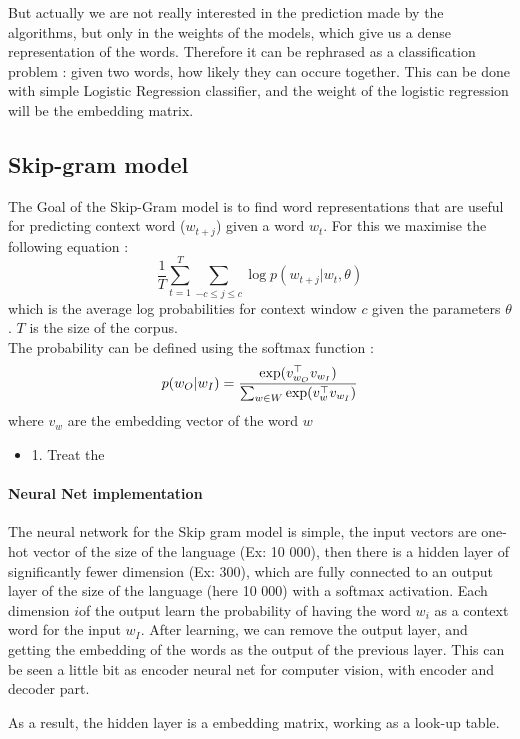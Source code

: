 			But actually we are not really interested in the prediction made by the algorithms, but only in the weights of the models, which give us a dense representation of the words. Therefore it can be rephrased as a classification problem : given two words, how likely they can occure together. This can be done with simple Logistic Regression classifier, and the weight of the logistic regression will be  the embedding matrix. 
  
		\subsection*{Skip-gram model}

			The Goal of the Skip-Gram model is to find word representations that are useful for predicting context word ($w_{t+j}$) given a word $w_t$. For this we maximise the following equation : 
			\[
				\frac{1}{T}\sum^T_{t=1} \sum_{-c\leq j\leq c}\log p(w_{t+j} | w_t, \theta)
			\]
			which is the average log probabilities for context window $c$ given the parameters $\theta$. $T$ is the size of the corpus.\\
			The probability can be defined using the softmax function : 
			\[
				p(w_O |  w_I) = \frac{\exp(v_{w_O}^\top v_{w_I})}{\sum_{w\in W}\exp(v_{w}^\top v_{w_I})}
			\]
			where $v_w$ are the embedding vector of the word $w$

			\begin{itemize}
				\item 1. Treat the 
			\end{itemize}

			\paragraph*{Neural Net implementation}

			The neural network for the Skip gram model is simple, the input vectors are one-hot vector of the size of the language (Ex: 10 000), then there is a hidden layer of significantly fewer dimension (Ex: 300), which are fully connected to an output layer of the size of the language (here 10 000) with a softmax activation. Each dimension $i$of the output learn the probability of having the word $w_i$ as a context word for the input $w_I$. After learning, we can remove the output layer, and getting the embedding of the words as the output of the previous layer. This can be seen a little bit as encoder neural net for computer vision, with encoder and decoder part. 

			As a result, the hidden layer is a embedding matrix, working as a look-up table. 

